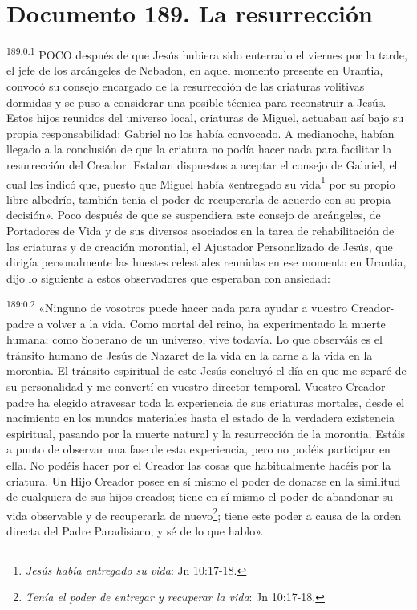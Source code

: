 \chapter{Documento 189. La resurrección}
\par 
\textsuperscript{189:0.1} POCO después de que Jesús hubiera sido enterrado el viernes por la tarde, el jefe de los arcángeles de Nebadon, en aquel momento presente en Urantia, convocó su consejo encargado de la resurrección de las criaturas volitivas dormidas y se puso a considerar una posible técnica para reconstruir a Jesús. Estos hijos reunidos del universo local, criaturas de Miguel, actuaban así bajo su propia responsabilidad; Gabriel no los había convocado. A medianoche, habían llegado a la conclusión de que la criatura no podía hacer nada para facilitar la resurrección del Creador. Estaban dispuestos a aceptar el consejo de Gabriel, el cual les indicó que, puesto que Miguel había «entregado su vida\footnote{\textit{Jesús había entregado su vida}: Jn 10:17-18.} por su propio libre albedrío, también tenía el poder de recuperarla de acuerdo con su propia decisión». Poco después de que se suspendiera este consejo de arcángeles, de Portadores de Vida y de sus diversos asociados en la tarea de rehabilitación de las criaturas y de creación morontial, el Ajustador Personalizado de Jesús, que dirigía personalmente las huestes celestiales reunidas en ese momento en Urantia, dijo lo siguiente a estos observadores que esperaban con ansiedad:

\par 
\textsuperscript{189:0.2} «Ninguno de vosotros puede hacer nada para ayudar a vuestro Creador-padre a volver a la vida. Como mortal del reino, ha experimentado la muerte humana; como Soberano de un universo, vive todavía. Lo que observáis es el tránsito humano de Jesús de Nazaret de la vida en la carne a la vida en la morontia. El tránsito espiritual de este Jesús concluyó el día en que me separé de su personalidad y me convertí en vuestro director temporal. Vuestro Creador-padre ha elegido atravesar toda la experiencia de sus criaturas mortales, desde el nacimiento en los mundos materiales hasta el estado de la verdadera existencia espiritual, pasando por la muerte natural y la resurrección de la morontia. Estáis a punto de observar una fase de esta experiencia, pero no podéis participar en ella. No podéis hacer por el Creador las cosas que habitualmente hacéis por la criatura. Un Hijo Creador posee en sí mismo el poder de donarse en la similitud de cualquiera de sus hijos creados; tiene en sí mismo el poder de abandonar su vida observable y de recuperarla de nuevo\footnote{\textit{Tenía el poder de entregar y recuperar la vida}: Jn 10:17-18.}; tiene este poder a causa de la orden directa del Padre Paradisiaco, y sé de lo que hablo».


